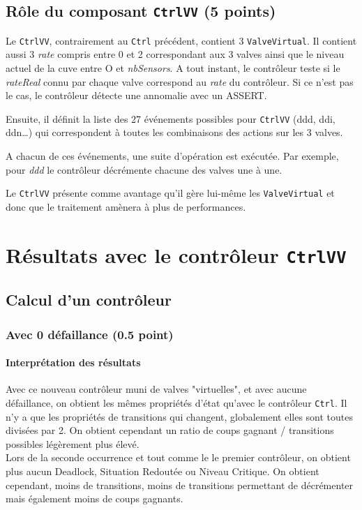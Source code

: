 \documentclass[a4paper]{book}
\begin{document}
\subsection{Rôle du composant {\tt CtrlVV} (5 points)}
Le {\tt CtrlVV}, contrairement au {\tt Ctrl} précédent, contient 3 {\tt ValveVirtual}. Il contient aussi 3 \textit{rate} 
compris entre 0 et 2 correspondant aux 3 valves ainsi que le niveau actuel de la cuve entre O et \textit{nbSensors}. A tout instant, 
le contrôleur teste si le \textit{rateReal} connu par chaque valve correspond au \textit{rate} du contrôleur. Si ce n'est pas le 
cas, le contrôleur détecte une annomalie avec un ASSERT.

Ensuite, il définit la liste des 27 événements possibles pour {\tt CtrlVV} (ddd, ddi, ddn\dots) qui correspondent à toutes les 
combinaisons des actions sur les 3 valves.

A chacun de ces événements, une suite d'opération est exécutée. Par exemple, pour \textit{ddd} le contrôleur décrémente chacune des 
valves une à une.

Le {\tt CtrlVV} présente comme avantage qu'il gère lui-même les {\tt ValveVirtual} et donc que le traitement amènera à plus de performances.

\section{Résultats avec le contrôleur {\tt CtrlVV}}
\subsection{Calcul d'un contrôleur}
\subsubsection{Avec 0 défaillance (0.5 point)}



%
%
\paragraph{Interprétation des résultats}
Avec ce nouveau contrôleur muni de valves "virtuelles", et avec aucune défaillance, on obtient les mêmes
propriétés d'état qu'avec le contrôleur {\tt Ctrl}. Il n'y a que les propriétés de transitions qui changent, 
globalement elles sont toutes divisées par 2. On obtient cependant un ratio de coups gagnant / transitions possibles légèrement plus élevé.  \\
Lors de la seconde occurrence et tout comme le le premier contrôleur, on obtient plus aucun Deadlock, Situation Redoutée ou Niveau Critique. 
On obtient cependant, moins de transitions, moins de transitions permettant de décrémenter mais également moins de coups gagnants.
\end{document}
